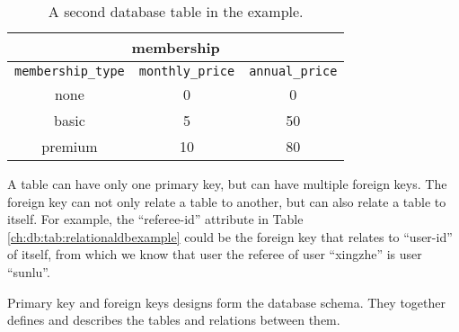 \begin{table}
	\centering \caption{A second database table in the example.}\label{ch:db:tab:relationaldbexampleanother}
	\begin{tabular}{|c|c|c|}
		\hline
        \multicolumn{3}{|c|}{membership} \\ \hline
		\verb|membership_type| & \verb|monthly_price| & \verb|annual_price| \\ \hline
        none & 0 & 0 \\ \hline
        basic & 5 & 50 \\ \hline
        premium & 10 & 80 \\ \hline
	\end{tabular}
\end{table}

A table can have only one primary key, but can have multiple foreign keys. The foreign key can not only relate a table to another, but can also relate a table to itself. For example, the ``referee-id'' attribute in Table \ref{ch:db:tab:relationaldbexample} could be the foreign key that relates to ``user-id'' of itself, from which we know that user the referee of user ``xingzhe'' is user ``sunlu''.

Primary key and foreign keys designs form the database schema. They together defines and describes the tables and relations between them.

